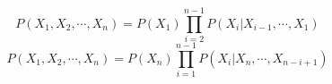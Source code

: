 \documentclass[a4paper,11pt,dvipdfmx]{jsarticle}
\begin{document}
\title{}
\author{21T2166D 渡辺大樹}
\date{\today}
\maketitle
\begin{equation}
    P(X_1,X_2,\cdots,X_n) = P(X_1)\prod_{i=2}^{n-1}P(X_i|X_{i-1},\cdots,X_1)
\end{equation}
\begin{equation}
    P(X_1,X_2,\cdots,X_n) = P(X_n)\prod_{i=1}^{n-1}P(X_i|X_n,\cdots,X_{n-i+1})
\end{equation}
\end{document}
